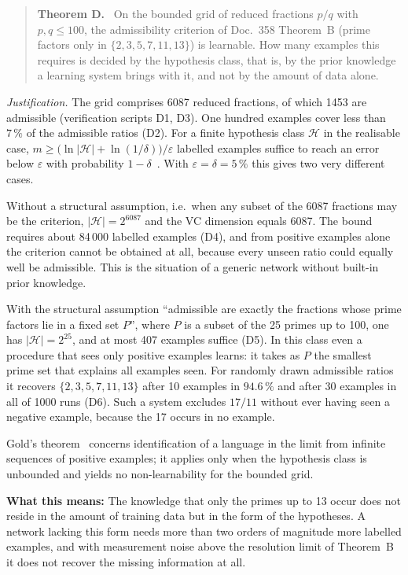 \begin{quote}
\textbf{Theorem D.} \BM\ On the bounded grid of reduced fractions $p/q$
with $p,q\le100$, the admissibility criterion of Doc.~358 Theorem~B
(prime factors only in $\{2,3,5,7,11,13\}$) is learnable. How many
examples this requires is decided by the hypothesis class, that is, by
the prior knowledge a learning system brings with it, and not by the
amount of data alone.
\end{quote}

\emph{Justification.} The grid comprises 6087 reduced fractions, of which
1453 are admissible (verification scripts D1, D3). One hundred examples
cover less than $7\,\%$ of the admissible ratios (D2). For a finite
hypothesis class $\mathcal H$ in the realisable case,
$m\ge\bigl(\ln|\mathcal H|+\ln(1/\delta)\bigr)/\varepsilon$ labelled
examples suffice to reach an error below $\varepsilon$ with probability
$1-\delta$ \LM\,\cite{ShalevShwartz2014}. With
$\varepsilon=\delta=5\,\%$ this gives two very different cases.

Without a structural assumption, i.e.\ when any subset of the 6087
fractions may be the criterion, $|\mathcal H|=2^{6087}$ and the VC
dimension equals 6087. The bound requires about 84\,000 labelled
examples (D4), and from positive examples alone the criterion cannot be
obtained at all, because every unseen ratio could equally well be
admissible. This is the situation of a generic network without built-in
prior knowledge.

With the structural assumption \enquote{admissible are exactly the
fractions whose prime factors lie in a fixed set $P$}, where $P$ is a
subset of the 25 primes up to 100, one has $|\mathcal H|=2^{25}$, and at
most 407 examples suffice (D5). In this class even a procedure that sees
only positive examples learns: it takes as $P$ the smallest prime set
that explains all examples seen. For randomly drawn admissible ratios it
recovers $\{2,3,5,7,11,13\}$ after 10 examples in $94.6\,\%$ and after
30 examples in all of 1000 runs (D6). Such a system excludes $17/11$
without ever having seen a negative example, because the 17 occurs in no
example.

Gold's theorem \LM\,\cite{Gold1967} concerns identification of a
language in the limit from infinite sequences of positive examples; it
applies only when the hypothesis class is unbounded and yields no
non-learnability for the bounded grid.

\textbf{What this means:} The knowledge that only the primes up to 13
occur does not reside in the amount of training data but in the form of
the hypotheses. A network lacking this form needs more than two orders
of magnitude more labelled examples, and with measurement noise above
the resolution limit of Theorem~B it does not recover the missing
information at all.

